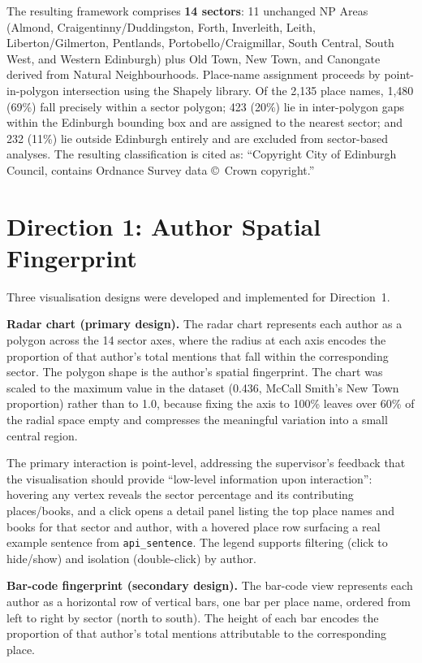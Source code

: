 \documentclass[logo,msc]{infthesis}
\begin{document}
The resulting framework comprises \textbf{14 sectors}: 11 unchanged NP Areas (Almond, Craigentinny/Duddingston, Forth, Inverleith, Leith, Liberton/Gilmerton, Pentlands, Portobello/Craigmillar, South Central, South West, and Western Edinburgh) plus Old Town, New Town, and Canongate derived from Natural Neighbourhoods. Place-name assignment proceeds by point-in-polygon intersection using the Shapely library. Of the 2,135 place names, 1,480 (69\%) fall precisely within a sector polygon; 423 (20\%) lie in inter-polygon gaps within the Edinburgh bounding box and are assigned to the nearest sector; and 232 (11\%) lie outside Edinburgh entirely and are excluded from sector-based analyses. The resulting classification is cited as: ``Copyright City of Edinburgh Council, contains Ordnance Survey data \copyright\ Crown copyright.''
 
\section{Direction 1: Author Spatial Fingerprint}
 
Three visualisation designs were developed and implemented for Direction~1.
 
\textbf{Radar chart (primary design).} The radar chart represents each author as a polygon across the 14 sector axes, where the radius at each axis encodes the proportion of that author's total mentions that fall within the corresponding sector. The polygon shape is the author's spatial fingerprint. The chart was scaled to the maximum value in the dataset (0.436, McCall Smith's New Town proportion) rather than to 1.0, because fixing the axis to 100\% leaves over 60\% of the radial space empty and compresses the meaningful variation into a small central region.
 
The primary interaction is point-level, addressing the supervisor's feedback that the visualisation should provide ``low-level information upon interaction'': hovering any vertex reveals the sector percentage and its contributing places/books, and a click opens a detail panel listing the top place names and books for that sector and author, with a hovered place row surfacing a real example sentence from \texttt{api\_sentence}. The legend supports filtering (click to hide/show) and isolation (double-click) by author.
 
\textbf{Bar-code fingerprint (secondary design).} The bar-code view represents each author as a horizontal row of vertical bars, one bar per place name, ordered from left to right by sector (north to south). The height of each bar encodes the proportion of that author's total mentions attributable to the corresponding place.
 
\end{document}
